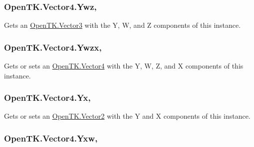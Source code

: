 \hypertarget{struct_open_t_k_1_1_vector4_aca49c9d39e463c4b3aa4c02d3498489a}{
\subsubsection[{Ywz}]{ Open\-T\-K.\-Vector4.\-Ywz\hspace{0.3cm}{\ttfamily [get]}, {\ttfamily [set]}}}\label{struct_open_t_k_1_1_vector4_aca49c9d39e463c4b3aa4c02d3498489a}


Gets an \hyperlink{struct_open_t_k_1_1_vector3}{Open\-T\-K.\-Vector3} with the Y, W, and Z components of this instance. 

\hypertarget{struct_open_t_k_1_1_vector4_aa25d25b27d3a2744686becfb16e7e39d}{
\subsubsection[{Ywzx}]{ Open\-T\-K.\-Vector4.\-Ywzx\hspace{0.3cm}{\ttfamily [get]}, {\ttfamily [set]}}}\label{struct_open_t_k_1_1_vector4_aa25d25b27d3a2744686becfb16e7e39d}


Gets or sets an \hyperlink{struct_open_t_k_1_1_vector4}{Open\-T\-K.\-Vector4} with the Y, W, Z, and X components of this instance. 

\hypertarget{struct_open_t_k_1_1_vector4_af8cfeb04cdb9a96f668edde34b69dd98}{
\subsubsection[{Yx}]{ Open\-T\-K.\-Vector4.\-Yx\hspace{0.3cm}{\ttfamily [get]}, {\ttfamily [set]}}}\label{struct_open_t_k_1_1_vector4_af8cfeb04cdb9a96f668edde34b69dd98}


Gets or sets an \hyperlink{struct_open_t_k_1_1_vector2}{Open\-T\-K.\-Vector2} with the Y and X components of this instance. 

\hypertarget{struct_open_t_k_1_1_vector4_a9fca4429b114e78a69519bf609ca622f}{
\subsubsection[{Yxw}]{ Open\-T\-K.\-Vector4.\-Yxw\hspace{0.3cm}{\ttfamily [get]}, {\ttfamily [set]}}}\label{struct_open_t_k_1_1_vector4_a9fca4429b114e78a69519bf609ca622f}


